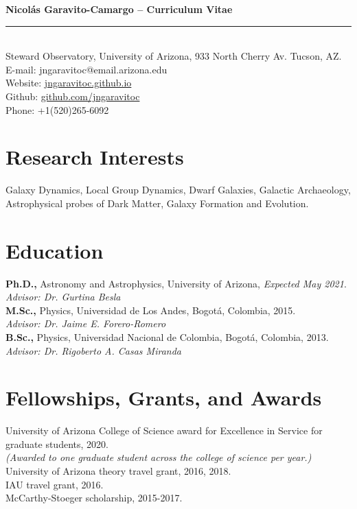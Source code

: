 \documentclass[UTF8]{article}
\begin{document}
\indent \textbf{\LARGE Nicol\'as Garavito-Camargo -- Curriculum Vitae} \\
\indent \rule{17cm}{0.4pt}\\

\noindent Steward Observatory, University of Arizona, 933 North Cherry Av. Tucson, AZ.\\
E-mail: jngaravitoc@email.arizona.edu\\ 
Website: \href{http://jngaravitoc.github.io/Garavito-Camargo}{jngaravitoc.github.io}\\
Github: \href{http://www.github.com/jngaravitoc}{github.com/jngaravitoc}\\
Phone: +1(520)265-6092
\section*{Research Interests}
Galaxy Dynamics, Local Group Dynamics, Dwarf Galaxies, Galactic
Archaeology, Astrophysical probes of Dark Matter, Galaxy Formation and Evolution.

\section*{Education}
\textbf{Ph.D.,} Astronomy and Astrophysics, University of Arizona, \textit{Expected May 2021}.\\
\indent \textit{Advisor: Dr. Gurtina Besla}\\
\textbf{M.Sc.,}  Physics, Universidad de Los Andes, Bogot\'a, Colombia, 2015.\\
\indent \textit{Advisor: Dr. Jaime E. Forero-Romero}\\
\textbf{B.Sc.,} Physics, Universidad Nacional de Colombia, Bogot\'a, Colombia, 2013.\\
\indent \textit{Advisor: Dr. Rigoberto A. Casas Miranda}

\section*{Fellowships, Grants, and Awards}

University of Arizona College of Science award for Excellence in
Service for graduate students, 2020. \\
\indent \textit{(Awarded to one graduate student across the college of
science per year.)}\\
University of Arizona theory travel grant, 2016, 2018. \\
IAU travel grant, 2016.\\
McCarthy-Stoeger scholarship, 2015-2017.
\end{document}
